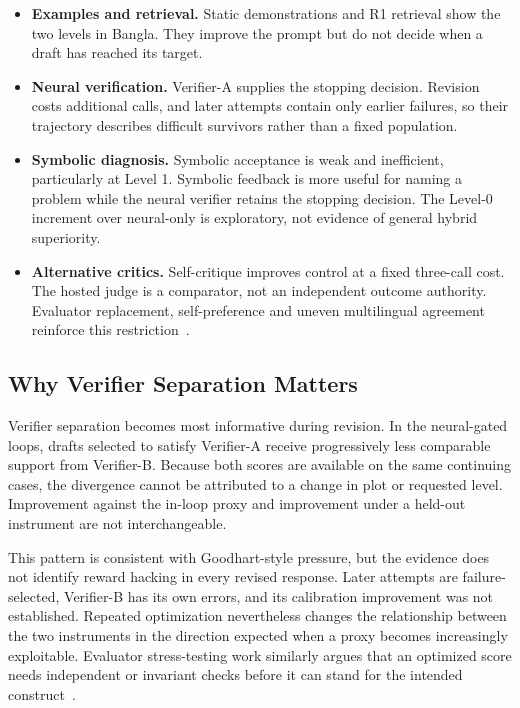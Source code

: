 \begin{itemize}
    \setlength{\itemsep}{2pt}
    \setlength{\parskip}{0pt}
    \setlength{\parsep}{0pt}
    \item \textbf{Examples and retrieval.} Static demonstrations and R1 retrieval show the two levels in Bangla. They improve the prompt but do not decide when a draft has reached its target.
    \item \textbf{Neural verification.} Verifier-A supplies the stopping decision. Revision costs additional calls, and later attempts contain only earlier failures, so their trajectory describes difficult survivors rather than a fixed population.
    \item \textbf{Symbolic diagnosis.} Symbolic acceptance is weak and inefficient, particularly at Level 1. Symbolic feedback is more useful for naming a problem while the neural verifier retains the stopping decision. The Level-0 increment over neural-only is exploratory, not evidence of general hybrid superiority.
    \item \textbf{Alternative critics.} Self-critique improves control at a fixed three-call cost. The hosted judge is a comparator, not an independent outcome authority. Evaluator replacement, self-preference and uneven multilingual agreement reinforce this restriction~\citep{b22,b23,b24,b25}.
\end{itemize}

\subsection{Why Verifier Separation Matters}
\label{sec:ch7-verifier-separation}

Verifier separation becomes most informative during revision. In the neural-gated loops, drafts selected to satisfy Verifier-A receive progressively less comparable support from Verifier-B. Because both scores are available on the same continuing cases, the divergence cannot be attributed to a change in plot or requested level. Improvement against the in-loop proxy and improvement under a held-out instrument are not interchangeable.

This pattern is consistent with Goodhart-style pressure, but the evidence does not identify reward hacking in every revised response. Later attempts are failure-selected, Verifier-B has its own errors, and its calibration improvement was not established. Repeated optimization nevertheless changes the relationship between the two instruments in the direction expected when a proxy becomes increasingly exploitable. Evaluator stress-testing work similarly argues that an optimized score needs independent or invariant checks before it can stand for the intended construct~\citep{b7}.

